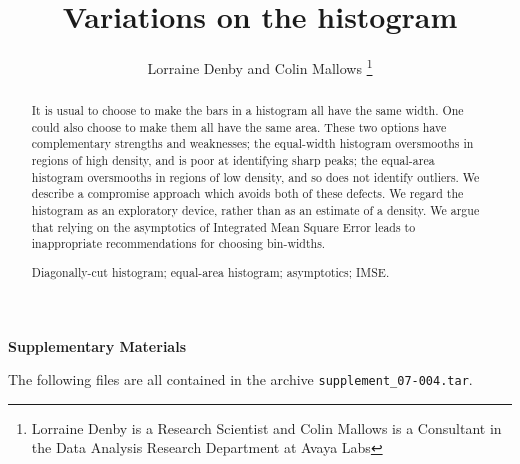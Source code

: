 \documentclass{jcgsf}
\title{Variations on the histogram}
\author{Lorraine Denby and Colin Mallows \thanks{
Lorraine Denby is a Research Scientist and Colin Mallows is
a Consultant in the Data Analysis Research Department at Avaya Labs}}
\begin{document}
\maketitle

\begin{abstract}
It is usual to choose to make the bars in a histogram all have the same
width.  One could also choose to make them all have the same area.  These two
options have complementary strengths and weaknesses;  the equal-width
histogram oversmooths in regions of high density, and is poor at
identifying sharp peaks; the equal-area histogram oversmooths in regions
of low density, and so does not identify outliers.  We describe
a compromise approach which avoids both of these defects.
We regard the histogram as an exploratory device, rather than as an estimate
of a density.  We argue that relying on the asymptotics of
Integrated Mean Square Error
leads to inappropriate recommendations for choosing bin-widths.

\begin{keywords}
Diagonally-cut  histogram; equal-area histogram;  asymptotics;
IMSE.

\end{keywords}
\end{abstract}




\bigskip




\centerline{\bf\large Supplementary Materials}

\bigskip

The following files are all contained in the archive {\tt  supplement\_07-004.tar}.
\end{document}
